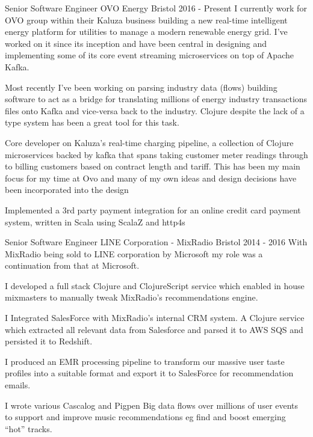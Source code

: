 \begin{cventries}

  \cventrypara
  {Senior Software Engineer} %
  {OVO Energy} %
  {Bristol} %
  {2016  - Present} %
  {I currently work for OVO group within their Kaluza business building a new real-time intelligent energy platform for
  utilities to manage a modern renewable energy grid. I've worked on it since its inception and have been central in designing
  and implementing some of its core event streaming microservices on top of Apache Kafka.}
  {
    \begin{cvitems} %
      \item {Most recently I've been working on parsing industry data (flows) building software to act as a bridge for
      translating millions of energy industry transactions files onto Kafka and vice-versa back to the industry. Clojure
      despite the lack of a type system has been a great tool for this task.}
      \item {Core developer on Kaluza's real-time charging pipeline, a collection of Clojure microservices backed by
      kafka that spans taking customer meter readings through to billing customers based on contract length and tariff.
      This has been my main focus for my time at Ovo and many of my own ideas and design decisions have been incorporated
      into the design}
      \item {Implemented a 3rd party payment integration for an online credit card payment system, written in Scala using
      ScalaZ and http4s}
    \end{cvitems}
  }

  \cventrypara
  {Senior Software Engineer} %
  {LINE Corporation - MixRadio} %
  {Bristol} %
  {2014  - 2016} %
  {With MixRadio being sold to LINE corporation by Microsoft my role was a continuation from that at Microsoft.}
  {
    \begin{cvitems} %
      \item {I developed a full stack Clojure and ClojureScript service which enabled in house mixmasters to manually
      tweak MixRadio's recommendations engine.}
      \item {I Integrated SalesForce with MixRadio’s internal CRM system. A Clojure service which extracted all
      relevant data from Salesforce and parsed it to AWS SQS and persisted it to Redshift.}
      \item {I produced an EMR processing pipeline to transform our massive user taste profiles into a suitable
      format and export it to SalesForce for recommendation emails.}
      \item {I wrote various Cascalog and Pigpen Big data flows over millions of user events to support and improve
      music recommendations eg find and boost emerging “hot” tracks.}
    \end{cvitems}
  }


\end{cventries}
